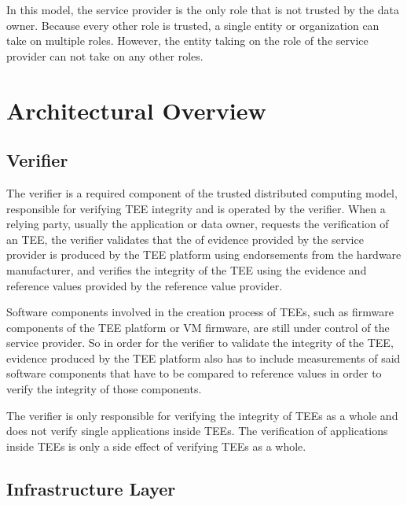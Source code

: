In this model, the service provider is the only role that is not trusted by the
data owner. Because every other role is trusted, a single entity or organization
can take on multiple roles. However, the entity taking on the role of the
service provider can not take on any other roles.

\section{Architectural Overview}
\label{sec:trusted-architecture-overview}

\subsection{Verifier}

The verifier is a required component of the trusted distributed computing
model, responsible for verifying TEE integrity and is operated by the verifier.
When a relying party, usually the application or data owner, requests the
verification of an TEE, the verifier validates that the of evidence provided by
the service provider is produced by the TEE platform using endorsements from the
hardware manufacturer, and verifies the integrity of the TEE using the evidence
and reference values provided by the reference value provider.

Software components involved in the creation process of TEEs, such as firmware
components of the TEE platform or VM firmware, are still under control of the
service provider. So in order for the verifier to validate the integrity of the
TEE, evidence produced by the TEE platform also has to include measurements of
said software components that have to be compared to reference values in order
to verify the integrity of those components.

The verifier is only responsible for verifying the integrity of TEEs as a whole
and does not verify single applications inside TEEs. The verification of
applications inside TEEs is only a side effect of verifying TEEs as a whole.

\subsection{Infrastructure Layer}

